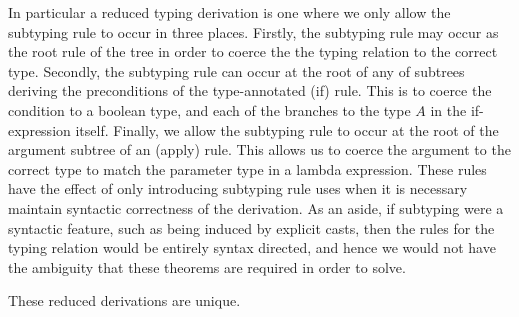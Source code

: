 \documentclass{Report}
\begin{document}

In particular a reduced typing derivation is one where we only allow the subtyping rule to occur in three places. Firstly, the subtyping rule may occur as the root rule of the tree in order to coerce the the typing relation to the correct type. Secondly, the subtyping rule can occur at the root of any of subtrees deriving the preconditions of the type-annotated (if) rule. This is to coerce the condition to a boolean type, and each of the branches to the type $A$ in the if-expression itself. Finally, we allow the subtyping rule to occur at the root of the argument subtree of an (apply) rule. This allows us to coerce the argument to the correct type to match the parameter type in a lambda expression. These rules have the effect of only introducing subtyping rule uses when it is necessary maintain syntactic correctness of the derivation. As an aside, if subtyping were a syntactic feature, such as being induced by explicit casts, then the rules for the typing relation would be entirely syntax directed, and hence we would not have the ambiguity that these theorems are required in order to solve.

\begin{theorem}
    These reduced derivations are unique.    
\end{theorem}
\end{document}
